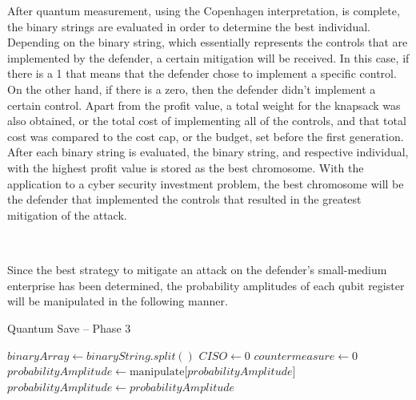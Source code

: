 After quantum measurement, using the Copenhagen interpretation, is complete, the binary strings are evaluated in order to determine the best individual. Depending on the binary string, which essentially represents the controls that are implemented by the defender, a certain mitigation will be received. In this case, if there is a 1 that means that the defender chose to implement a specific control. On the other hand, if there is a zero, then the defender didn’t implement a certain control. Apart from the profit value, a total weight for the knapsack was also obtained, or the total cost of implementing all of the controls, and that total cost was compared to the cost cap, or the budget, set before the first generation. After each binary string is evaluated, the binary string, and respective individual, with the highest profit value is stored as the best chromosome. With the application to a cyber security investment problem, the best chromosome will be the defender that implemented the controls that resulted in the greatest mitigation of the attack.

\subsection*{\color{SubSectionBlue}{Phase 3 of Quantum Save}}
 \\

Since the best strategy to mitigate an attack on the defender’s small-medium enterprise has been determined, the probability amplitudes of each qubit register will be manipulated in the following manner.

\begin{algorithm}
\caption{Quantum Save -- Phase 3}
\begin{algorithmic}[1]
\State $binaryArray \gets binaryString.split()$
\State $CISO \gets 0$
    \State $countermeasure \gets 0$
            \State $probabilityAmplitude \gets \text{manipulate[}probabilityAmplitude\text{]}$
        \EndIf
        \State $probabilityAmplitude \gets probabilityAmplitude$
    \EndWhile
\EndWhile
\end{algorithmic}
\end{algorithm}

